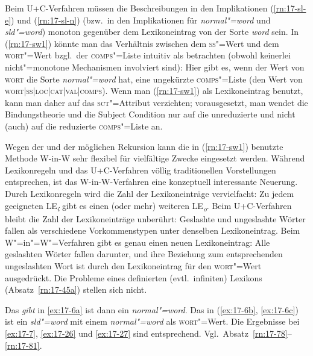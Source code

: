 \documentclass[output=paper]{LSP/langsci}
\begin{document}
\randnum\label{rn:17-85}Beim U+C-Verfahren müssen die Beschreibungen in den
Implikationen (\ref{rn:17-sl-e}) und (\ref{rn:17-sl-n}) (bzw.\ in den Implikationen für
\textit{normal"=word} und \textit{sld"=word}) monoton gegenüber dem
Lexikoneintrag von der Sorte \textit{word} sein. In (\ref{rn:17-sw1}) könnte man das
Verhältnis zwischen dem \textsc{ss}"=Wert und dem \textsc{wort}"=Wert
bzgl.\ der \textsc{comps}"=Liste intuitiv als
 betrachten (obwohl keinerlei
nicht"=monotone Mechanismen involviert sind): Hier gibt es, wenn der
Wert von \textsc{wort} die Sorte \textit{normal"=word} hat, eine
ungekürzte \textsc{comps}"=Liste (den Wert von
\textsc{wort|ss|loc|cat|val|{\allowbreak}comps}). Wenn man (\ref{rn:17-sw1}) als Lexikoneintrag
benutzt, kann man daher auf das \textsc{sct}"=Attribut verzichten;
vorausgesetzt, man wendet die Bindungstheorie und die Subject
Condition nur auf die unreduzierte und nicht (auch) auf die reduzierte
\textsc{comps}"=Liste an.

\randnum\label{rn:17-86}Wegen der  und der möglichen
Rekursion kann die in (\ref{rn:17-sw1}) benutzte Methode W-in-W sehr flexibel für
vielfältige Zwecke eingesetzt werden. Während Lexikonregeln und das
U+C-Verfahren völlig traditionellen Vorstellungen entsprechen, ist das
W-in-W-Verfahren eine konzeptuell interessante Neuerung. Durch
Lexikonregeln wird die Zahl der Lexikoneinträge vervielfacht: Zu jedem
geeigneten LE\textsubscript{\textit{i}} gibt es einen (oder mehr) weiteren LE\textsubscript{\textit{o}}. Beim
U+C-Verfahren bleibt die Zahl der Lexikoneinträge unberührt: Geslashte
und ungeslashte Wörter fallen als verschiedene Vorkommenstypen unter
denselben Lexikoneintrag. Beim W"=in"=W"=Verfahren gibt es genau einen
neuen Lexikoneintrag: Alle ge{\-}slash{\-}ten Wörter fallen darunter, und ihre
Beziehung zum entsprechenden ungeslashten Wort ist durch den
Lexikoneintrag für den \textsc{wort}"=Wert ausgedrückt. Die Probleme eines
 definierten (evtl.\ infiniten) Lexikons (Absatz~\ref{rn:17-45a}) stellen
sich nicht.

\randnum\label{rn:17-87}Das \textit{gibt} in \eqref{ex:17-6a} ist dann ein \textit{normal"=word}. Das in
(\ref{ex:17-6b}, \ref{ex:17-6c}) ist ein \textit{sld"=word} mit einem \textit{normal"=word} als
\textsc{wort}"=Wert. Die Ergebnisse bei \eqref{ex:17-7}, \eqref{ex:17-26} und \eqref{ex:17-27} sind
entsprechend. Vgl.\ Absatz~\ref{rn:17-78}--\ref{rn:17-81}.
\end{document}
